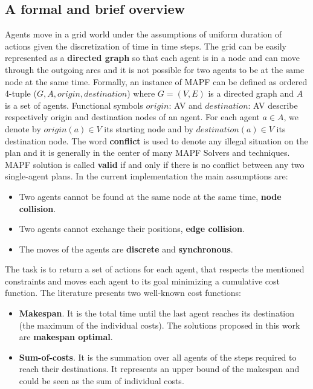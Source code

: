 \documentclass[12pt, a4paper, hidelinks]{article}
\numberwithin{equation}{section}
\begin{document}
\subsection*{A formal and brief overview}
Agents move in a grid world under the assumptions of uniform duration of actions given the discretization of time in time steps.
The grid can be easily represented as a \textbf{directed graph} so that each agent is in a node and can move through the outgoing arcs and it is not possible for two agents to be at the same node at the same time.
Formally, an instance of MAPF can be defined as ordered 4-tuple ($G, A, origin, destination$) where $G = (V, E)$ is a directed graph and $A$ is a set of agents.
Functional symbols $origin$: A\textrightarrow V and $destination$: A\textrightarrow V describe respectively origin and destination nodes of an agent.
For each agent $a\in A$, we denote by $origin(a)\in V$ its starting node and by $destination(a)\in V$ its destination node.
The word \textbf{conflict} is used to denote any illegal situation on the plan and it is generally in the center of many MAPF Solvers and techniques.
MAPF solution is called \textbf{valid} if and only if there is no conflict between any two single-agent plans.
In the current implementation the main assumptions are:

\begin{itemize} 
\item Two agents cannot be found at the same node at the same time, \textbf{node collision}.
\item Two agents cannot exchange their positions, \textbf{edge collision}.
\item The moves of the agents are \textbf{discrete} and \textbf{synchronous}.\\
\end{itemize}
The task is to return a set of actions for each agent, that respects the mentioned constraints and moves each agent to its goal minimizing a cumulative cost function.
The literature presents two well-known cost functions:

\begin{itemize}
\item \textbf{Makespan}.
It is the total time until the last agent reaches its destination (the maximum of the individual costs).
The solutions proposed in this work are \textbf{makespan optimal}.
\item \textbf{Sum-of-costs}.
It is the summation over all agents of the steps required to reach their destinations. 
It represents an upper bound of the makespan and could be seen as the sum of individual costs.
\end{itemize}
\end{document}
